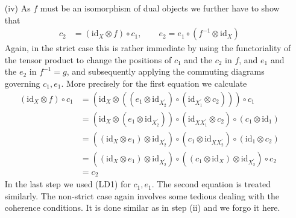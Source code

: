 \begin{prf}
\begin{enumerate}
\item[(iv)]
As $f$ must be an isomorphism of dual objects we further have to show that
\begin{align*}
  c_{2}
  &=
  (\mathrm{id}_{X} \otimes f)
  \circ
  c_{1}
  ,\qquad
  e_{2}
  =
  e_{1}
  \circ
  (f^{-1} \otimes \mathrm{id}_{X})
\end{align*}
Again, in the strict case this is rather immediate by using the functoriality of the tensor product to change the positions of $c_{1}$ and the $c_{2}$ in $f$, and $e_{1}$ and the $e_{2}$ in $f^{-1} = g$, and subsequently applying the commuting diagrams governing $c_{1},e_{1}$. More precisely for the first equation we calculate
\begin{align*}
  (\mathrm{id}_{X} \otimes f)
  \circ
  c_{1}
  &=
  \left(
    \mathrm{id}_{X}
    \otimes
    \left(
      \left(
        e_{1}
        \otimes
        \mathrm{id}_{X_{2}^{\prime}}
      \right)
      \circ
      \left(
        \mathrm{id}_{X_{1}^{\prime}}
        \otimes
        c_{2}
      \right)
    \right)
  \right)
  \circ
  c_{1}
  \\
  &=
  \left(
    \mathrm{id}_{X}
    \otimes
    \left(
      e_{1}
      \otimes
      \mathrm{id}_{X_{2}^{\prime}}
    \right)
  \right)
  \circ
  \left(
    \mathrm{id}_{X X_{1}^{\prime}}
    \otimes
    c_{2}
  \right)
  \circ
  \left(
    c_{1}
    \otimes
    \mathrm{id}_{1}
  \right)
  \\
  &=
  \left(
    \left(
      \mathrm{id}_{X}
      \otimes
      e_{1}
    \right)
    \otimes
    \mathrm{id}_{X_{2}^{\prime}}
  \right)
  \circ
  \left(
    c_{1}
    \otimes
    \mathrm{id}_{X X_{2}^{\prime}}
  \right)
  \circ
  \left(
    \mathrm{id}_{1}
    \otimes
    c_{2}
  \right)
  \\
  &=
  \left(
    \left(
      \mathrm{id}_{X}
      \otimes
      e_{1}
    \right)
    \otimes
    \mathrm{id}_{X_{2}^{\prime}}
  \right)
  \circ
  \left(
    \left(
      c_{1}
      \otimes
      \mathrm{id}_{X}
    \right)
    \otimes
    \mathrm{id}_{X_{2}^{\prime}}
  \right)
  \circ
  c_{2}
  \\
  &=
  c_{2}
\end{align*}
In the last step we used (LD1) for $c_{1},e_{1}$. The second equation is treated similarly. The non-strict case again involves some tedious dealing with the coherence conditions. It is done similar as in step (ii) and we forgo it here.


\end{enumerate}
\end{prf}
